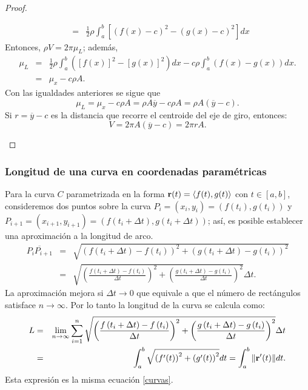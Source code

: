 \begin{proof}
\begin{parrafoitemize}
\begin{eqnarray*}
      &=& \frac{1}{2}\rho \int_{a}^{b}\left[ \left( f(x) -c\right) ^{2}-\left(g(x) -c\right) ^{2}\right] dx
    \end{eqnarray*}
    Entonces, $\rho V = 2\pi \mu_L$; además,
    \begin{eqnarray*}\mu_{L} &=& \frac{1}{2}\rho\int_{a}^{b}\left([f(x)]^2-[g(x)]^2\right)dx-c\rho\int_{a}^{b}\left(f(x) -g(x)\right)dx. \\&=& \mu_x-c\rho A.
    \end{eqnarray*}
    Con las igualdades anteriores se sigue que
    \[\mu_{L}=\mu_x-c\rho A=\rho A \overline{y}-c\rho A= \rho A (\overline{y}-c).\]
    Si $r=\overline{y}-c$ es la distancia que recorre el centroide del eje de giro, entonces:
    \[V=2\pi A (\overline{y}-c)=2\pi r A.\]
  \end{parrafoitemize}
\end{proof}

\subsubsection{Longitud de una curva en coordenadas paramétricas}

Para la curva $C$ parametrizada en la forma ${\bf r}(t)=\langle f(t),g(t)\rangle$ con $t\in [a,b]$,
consideremos dos puntos sobre la curva
$P_{i}=\left( x_{i},y_{i}\right) =\left( f\left( t_{i}\right) ,g\left(t_{i}\right) \right) $
y $P_{i+1}=\left( x_{i+1},y_{i+1}\right) =\left( f\left( t_{i}+\Delta t\right),g\left( t_{i}+\Delta t\right) \right) $;
así, es posible establecer una aproximación a la longitud de arco.
\begin{eqnarray*}
  \overline{P_{i}P_{i+1}}&=& \sqrt{\left( f\left( t_{i}+\Delta t\right) -f\left( t_{i}\right) \right) ^{2}+\left( g\left( t_{i}+\Delta t\right) -g\left( t_{i}\right) \right) ^{2}} \\
  &=& \sqrt{\left( \frac{f\left( t_{i}+\Delta t\right) -f\left(t_{i}\right) }{\Delta t}\right) ^{2}+\left( \frac{g\left( t_{i}+\Delta t\right) -g\left( t_{i}\right) }{\Delta t}\right) ^{2}}\Delta t.
\end{eqnarray*}
La aproximación mejora si $\Delta t\to 0$ que equivale a que el número de rectángulos satisface $n \to \infty$.
Por lo tanto la longitud de la curva se calcula como:
\begin{eqnarray*}
  L&=&\lim_{n\rightarrow \infty } \sum_{i=1}^{n}\sqrt{\left( \frac{%
    f\left( t_{i}+\Delta t\right) -f\left( t_{i}\right) }{\Delta t}\right)
    ^{2}+ \left( \frac{g\left( t_{i}+\Delta t\right) -g\left( t_{i}\right) }{%
  \Delta t}\right) ^{2}}\Delta t\\
  &=& \int_{a}^{b}\sqrt{\left(f^{\prime}(t)\right)^{2}+\left(g^{\prime}(t)\right)^{2}}dt=\int_{a}^{b}\Vert{\bf r}^\prime(t)\Vert dt.
\end{eqnarray*}
Esta expresión es la misma ecuación \ref{curvas}.
